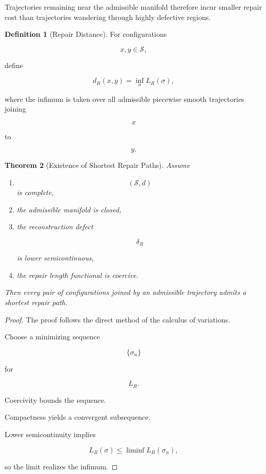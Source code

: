 \documentclass[11pt]{book}
\numberwithin{equation}{chapter}
\theoremstyle{definition}
\newtheorem{definition}{Definition}[chapter]
\theoremstyle{plain}
\newtheorem{theorem}[definition]{Theorem}
\begin{document}
Trajectories remaining near the admissible manifold therefore incur
smaller repair cost than trajectories wandering through highly defective
regions.

\begin{definition}[Repair Distance]

For configurations

\[
x,y
\in
\mathcal S,
\]

define

\[
d_R(x,y)
=
\inf_{\sigma}
L_R(\sigma),
\]

where the infimum is taken over all admissible piecewise smooth
trajectories joining

\[
x
\]

to

\[
y.
\]

\end{definition}

\begin{theorem}[Existence of Shortest Repair Paths]

Assume

\begin{enumerate}

\item
\[
(\mathcal S,d)
\]
is complete,

\item
the admissible manifold is closed,

\item
the reconstruction defect

\[
\delta_R
\]

is lower semicontinuous,

\item
the repair length functional is coercive.

\end{enumerate}

Then every pair of configurations joined by an admissible trajectory
admits a shortest repair path.

\end{theorem}

\begin{proof}

The proof follows the direct method of the calculus of variations.

Choose a minimizing sequence

\[
\{\sigma_n\}
\]

for

\[
L_R.
\]

Coercivity bounds the sequence.

Compactness yields a convergent subsequence.

Lower semicontinuity implies

\[
L_R(\sigma)
\le
\liminf
L_R(\sigma_n),
\]

so the limit realizes the infimum.

\end{proof}
\end{document}
